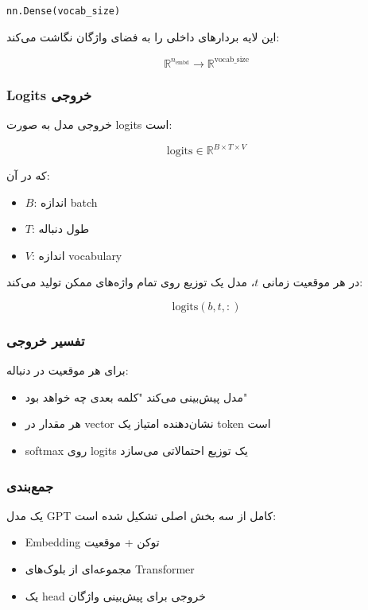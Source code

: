 \documentclass{article}
\begin{document}
\begin{latin}
	\texttt{nn.Dense(vocab\_size)}
\end{latin}

این لایه بردارهای داخلی را به فضای واژگان نگاشت می‌کند:

\[
\mathbb{R}^{n_{\text{embd}}} \rightarrow \mathbb{R}^{\text{vocab\_size}}
\]

\subsubsection*{Logits خروجی}

خروجی مدل به صورت logits است:

\[
\text{logits} \in \mathbb{R}^{B \times T \times V}
\]

که در آن:

\begin{itemize}
	\item \( B \): اندازه batch
	\item \( T \): طول دنباله
	\item \( V \): اندازه vocabulary
\end{itemize}

در هر موقعیت زمانی \( t \)، مدل یک توزیع روی تمام واژه‌های ممکن تولید می‌کند:

\[
\text{logits}(b, t, :)
\]

\subsubsection*{تفسیر خروجی}

برای هر موقعیت در دنباله:

\begin{itemize}
	\item مدل پیش‌بینی می‌کند "کلمه بعدی چه خواهد بود"
	\item هر مقدار در vector نشان‌دهنده امتیاز یک token است
	\item softmax روی logits یک توزیع احتمالاتی می‌سازد
\end{itemize}

\subsubsection*{جمع‌بندی}

یک مدل GPT کامل از سه بخش اصلی تشکیل شده است:

\begin{itemize}
	\item Embedding توکن + موقعیت
	\item مجموعه‌ای از بلوک‌های Transformer
	\item یک head خروجی برای پیش‌بینی واژگان
\end{itemize}
\end{document}
